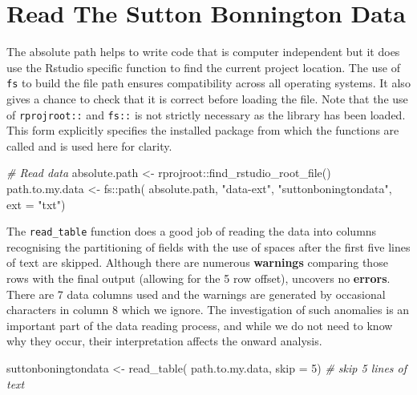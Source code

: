 \documentclass{article}
\newenvironment{Shaded}{\begin{snugshade}}{\end{snugshade}}
\newcommand{\AttributeTok}[1]{\textcolor[rgb]{0.77,0.63,0.00}{#1}}
\newcommand{\CommentTok}[1]{\textcolor[rgb]{0.56,0.35,0.01}{\textit{#1}}}
\newcommand{\DecValTok}[1]{\textcolor[rgb]{0.00,0.00,0.81}{#1}}
\newcommand{\FunctionTok}[1]{\textcolor[rgb]{0.00,0.00,0.00}{#1}}
\newcommand{\NormalTok}[1]{#1}
\newcommand{\OtherTok}[1]{\textcolor[rgb]{0.56,0.35,0.01}{#1}}
\newcommand{\SpecialCharTok}[1]{\textcolor[rgb]{0.00,0.00,0.00}{#1}}
\newcommand{\StringTok}[1]{\textcolor[rgb]{0.31,0.60,0.02}{#1}}
\begin{document}
\hypertarget{read-the-sutton-bonnington-data}{%
\section{Read The Sutton Bonnington Data}\label{read-the-sutton-bonnington-data}}

The absolute path helps to write code that is computer independent but it does use the Rstudio specific function to find the current project location. The use of \texttt{fs} to build the file path ensures compatibility across all operating systems. It also gives a chance to check that it is correct before loading the file. Note that the use of \texttt{rprojroot::} and \texttt{fs::} is not strictly necessary as the library has been loaded. This form explicitly specifies the installed package from which the functions are called and is used here for clarity.

\begin{Shaded}
\begin{Highlighting}[]
\CommentTok{\# Read data}
\NormalTok{absolute.path }\OtherTok{\textless{}{-}}\NormalTok{ rprojroot}\SpecialCharTok{::}\FunctionTok{find\_rstudio\_root\_file}\NormalTok{()}
\NormalTok{path.to.my.data }\OtherTok{\textless{}{-}}\NormalTok{ fs}\SpecialCharTok{::}\FunctionTok{path}\NormalTok{( absolute.path,}
                             \StringTok{"data{-}ext"}\NormalTok{,}
                             \StringTok{"suttonboningtondata"}\NormalTok{, }
                            \AttributeTok{ext =} \StringTok{"txt"}\NormalTok{)}
\end{Highlighting}
\end{Shaded}

The \texttt{read\_table} function does a good job of reading the data into columns recognising the partitioning of fields with the use of spaces after the first five lines of text are skipped. Although there are numerous \textbf{warnings} comparing those rows with the final output (allowing for the 5 row offset), uncovers no \textbf{errors}. There are 7 data columns used and the warnings are generated by occasional characters in column 8 which we ignore. The investigation of such anomalies is an important part of the data reading process, and while we do not need to know why they occur, their interpretation affects the onward analysis.

\begin{Shaded}
\begin{Highlighting}[]
\NormalTok{suttonboningtondata }\OtherTok{\textless{}{-}} \FunctionTok{read\_table}\NormalTok{(}
\NormalTok{                        path.to.my.data, }
                        \AttributeTok{skip =} \DecValTok{5}\NormalTok{) }\CommentTok{\# skip 5 lines of text}
\end{Highlighting}
\end{Shaded}
\end{document}
